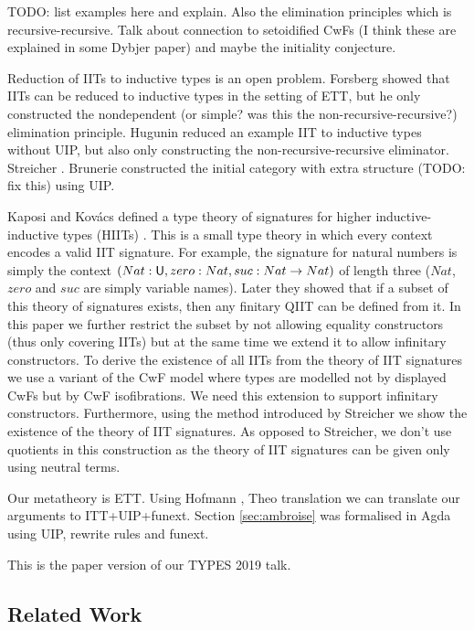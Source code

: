 \documentclass[a4paper,UKenglish,cleveref, autoref]{lipics-v2019}
\begin{document}
TODO: list examples here and explain. Also the elimination principles
which is recursive-recursive. Talk about connection to setoidified
CwFs (I think these are explained in some Dybjer paper) and maybe the
initiality conjecture.

Reduction of IITs to inductive types is an open problem. Forsberg
showed that IITs can be reduced to inductive types in the setting of
ETT, but he only constructed the nondependent (or simple? was this the
non-recursive-recursive?) elimination principle. Hugunin \cite{jasper}
reduced an example IIT to inductive types without UIP, but also only
constructing the non-recursive-recursive eliminator. Streicher
\cite{streichersemantics}. Brunerie \cite{} constructed the initial
category with extra structure (TODO: fix this) using UIP.

Kaposi and Kov{\'a}cs defined a type theory of signatures for higher
inductive-inductive types (HIITs)
\cite{kaposi_et_al:LIPIcs:2018:9190}. This is a small type theory in
which every context encodes a valid IIT signature. For example, the
signature for natural numbers is simply the context
$(Nat:\mathsf{U},zero:Nat,suc:Nat\rightarrow Nat)$ of length three ($Nat$, $zero$ and
$suc$ are simply variable names). Later they showed
\cite{Kaposi:2019:CQI:3302515.3290315} that if a subset of this theory
of signatures exists, then any finitary QIIT can be defined from
it. In this paper we further restrict the subset by not allowing
equality constructors (thus only covering IITs) but at the same time
we extend it to allow infinitary constructors. To derive the existence
of all IITs from the theory of IIT signatures we use a variant of the
CwF model \cite{Kaposi:2019:CQI:3302515.3290315} where types are
modelled not by displayed CwFs but by CwF isofibrations. We need this
extension to support infinitary constructors. Furthermore, using the
method introduced by Streicher \cite{streichersemantics} we show the
existence of the theory of IIT signatures. As opposed to Streicher, we
don't use quotients in this construction as the theory of IIT
signatures can be given only using neutral terms.

Our metatheory is ETT. Using Hofmann \cite{}, Theo \cite{} translation
we can translate our arguments to ITT+UIP+funext. Section
\ref{sec:ambroise} was formalised in Agda using UIP, rewrite rules and
funext.

This is the paper version of our TYPES 2019 talk.

\subsection{Related Work}
\end{document}
